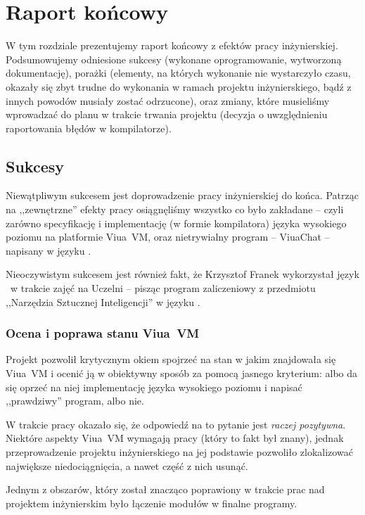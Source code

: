 \chapter{Raport końcowy}
\label{raport_koncowy}

W tym rozdziale prezentujemy raport końcowy z efektów pracy inżynierskiej.
Podsumowujemy odniesione sukcesy (wykonane oprogramowanie, wytworzoną dokumentację), porażki (elementy, na
których wykonanie nie wystarczyło czasu, okazały się zbyt trudne do wykonania w ramach projektu
inżynierskiego, bądź z innych powodów musiały zostać odrzucone), oraz zmiany, które musieliśmy wprowadzać do
planu w trakcie trwania projektu (decyzja o uwzględnieniu raportowania błędów w kompilatorze).

\section{Sukcesy}

Niewątpliwym sukcesem jest doprowadzenie pracy inżynierskiej do końca. Patrząc
na ,,zewnętrzne'' efekty pracy osiągnęliśmy wszystko co było zakładane -- czyli
zarówno specyfikację i implementację (w formie kompilatora) języka wysokiego
poziomu na platformie Viua~VM, oraz nietrywialny program -- ViuaChat -- napisany
w języku \ViuAct.

Nieoczywistym sukcesem jest również fakt, że Krzysztof Franek wykorzystał język
\ViuAct\ w trakcie zajęć na Uczelni -- pisząc program zaliczeniowy z
przedmiotu ,,Narzędzia Sztucznej Inteligencji'' w języku \ViuAct.

\subsection{Ocena i poprawa stanu Viua~VM}

Projekt pozwolił krytycznym okiem spojrzeć na stan w jakim znajdowała się
Viua~VM i ocenić ją w obiektywny sposób za pomocą jasnego kryterium: albo da się
oprzeć na niej implementację języka wysokiego poziomu i napisać ,,prawdziwy''
program, albo nie.

W trakcie pracy okazało się, że odpowiedź na to pytanie jest \emph{raczej
pozytywna}. Niektóre aspekty Viua~VM wymagają pracy (który to fakt był znany),
jednak przeprowadzenie projektu inżynierskiego na jej podstawie pozwoliło
zlokalizować największe niedociągnięcia, a nawet część z nich usunąć.

Jednym z obszarów, który został znacząco poprawiony w trakcie prac nad
projektem inżynierskim było łączenie modułów w finalne programy.


